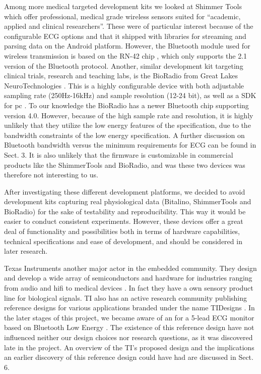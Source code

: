 Among more medical targeted development kits we looked at Shimmer Tools \cite{newRef:41} which offer professional, medical grade wireless sensors suited for ``academic, applied and clinical researchers''. These were of particular interest because of the configurable ECG options and that it shipped with libraries \cite{newRef:41} for streaming and parsing data on the Android platform. However, the Bluetooth module used for wireless transmission is based on the RN-42 chip \cite{newRef:43}, which only supports the 2.1 version of the Bluetooth protocol. Another, similar development kit targeting clinical trials, research and teaching labs, is the BioRadio from Great Lakes NeuroTechnologies \cite{newRef:44}. This is a highly configurable device with both adjustable sampling rate (250Hz-16kHz) and sample resolution (12-24 bit), as well as a SDK for pc \cite{newRef:45}. To our knowledge the BioRadio has a newer Bluetooth chip supporting version 4.0. However, because of the high sample rate and resolution, it is highly unlikely that they utilize the low energy features of the specification, due to the bandwidth constraints of the low energy specification. A further discussion on Bluetooth bandwidth versus the minimum requirements for ECG can be found in Sect. 3. It is also unlikely that the firmware is customizable in commercial products like the ShimmerTools and BioRadio, and was these two devices was therefore not interesting to us.

After investigating these different development platforms, we decided to avoid development kits capturing real physiological data (Bitalino, ShimmerTools and BioRadio) for the sake of testability and reproducibility. This way it would be easier to conduct consistent experiments. However, these devices offer a great deal of functionality and possibilities both in terms of hardware capabilities, technical specifications and ease of development, and should be considered in later research.

Texas Instruments another major actor in the embedded community. They design and develop a wide array of semiconductors and hardware for industries ranging from audio and hifi to medical devices \cite{newRef:46}. In fact they have a own sensory product line for biological signals. TI also has an active research community publishing reference designs for various applications branded under the name TIDesigns \cite{newRef:47}. In the later stages of this project, we became aware of an for a 5-lead ECG monitor based on Bluetooth Low Energy \cite{Anonymous:Q0qkTQkl}. The existence of this reference design have not influenced neither our design choices nor research questions, as it was discovered late in the project. An overview of the TI's proposed design and the implications an earlier discovery of this reference design could have had are discussed in Sect. 6.

